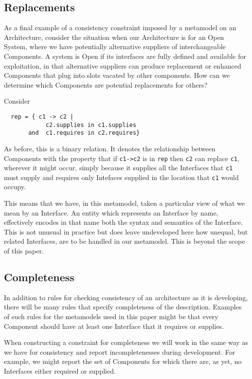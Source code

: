 \documentclass[a4paper,twoside]{article}
\begin{document}
\subsection{Replacements}

\noindent As a final example of a consistency constraint imposed by a metamodel on an Architecture, consider the situation when our Architecture is for an Open System, where we have potentially alternative suppliers of interchangeable Components. A system is Open if its interfaces are fully defined and available for exploitation, in that alternative suppliers can produce replacement or enhanced Components that plug into slots vacated by other components. How can we determine which Components are potential replacements for others?

Consider 
\begin{small}
\begin{verbatim}
  rep = { c1 -> c2 | 
            c2.supplies in c1.supplies 
       and  c1.requires in c2.requires} 
\end{verbatim}
\end{small}
As before, this is a binary relation. It denotes the relationship between Components with the property that if \verb$c1->c2$ is in \verb$rep$ then \verb$c2$ can replace \verb$c1$, wherever it might occur, simply because it supplies all the Interfaces that \verb$c1$ must supply and requires only Intefaces supplied in the location that \verb$c1$ would occupy.

This means that we have, in this metamodel, taken a particular view of what we mean by an Interface. An entity which represents an Interface by name, effectively encodes in that name both the syntax and semantics of the Interface. This is not unusual in practice but does leave undeveloped here how unequal, but related Interfaces, are to be handled in our metamodel. This is beyond the scope of this paper.

\subsection{Completeness}

\noindent In addition to rules for checking consistency of an architecture as it is developing, there will be many rules that specify completeness of the description. Examples of such rules for the metamodels used in this paper might be that every Component should have at least one Interface that it requires or supplies.

When constructing a constraint for completeness we will work in the same way as we have for consistency and report incompletenesses during development. For example, we might report the set of Components for which there are, as yet, no Interfaces either required or supplied.
\end{document}
